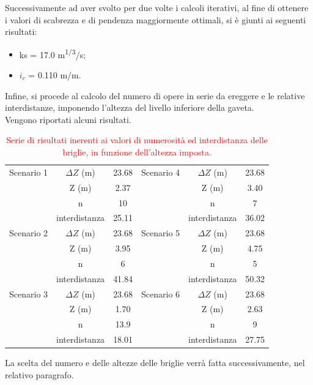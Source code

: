 Successivamente ad aver svolto per due volte i calcoli iterativi, al fine di ottenere i valori di scabrezza e di pendenza maggiormente ottimali, si è giunti ai seguenti risultati:
\begin{itemize}
    \item ks = 17.0 \unit{m^{1/3}/s};
    \item $i_c$ = 0.110 \unit{m/m}.
\end{itemize}

Infine, si procede al calcolo del numero di opere in serie da ereggere e le relative interdistanze, imponendo l'altezza del livello inferiore della gaveta.\\
Vengono riportati alcuni risultati.
\begin{table}[H] \centering
    \caption{\textcolor{red}{Serie di risultati inerenti ai valori di numerosità ed interdistanza delle briglie, in funzione dell'altezza imposta.}}
    \begin{tabular}{ccc|ccc}
        \toprule
    Scenario 1 & $\Delta Z$ (m)& 23.68 & Scenario 4 & $\Delta Z$ (m) & 23.68 \\
& Z (m)         & 2.37  &            & Z (m)         & 3.40  \\
& n             & 10  &            & n             & 7  \\
& interdistanza & 25.11 &            & interdistanza & 36.02 \\
\midrule
Scenario 2 & $\Delta Z$ (m)        & 23.68 & Scenario 5 & $\Delta Z$ (m) & 23.68 \\
& Z (m)         & 3.95  &            & Z (m)         & 4.75  \\
& n             & 6   &            & n             & 5   \\
& interdistanza & 41.84 &            & interdistanza & 50.32 \\
    \midrule
Scenario 3 & $\Delta Z$ (m)        & 23.68 & Scenario 6 & $\Delta Z$ (m)        & 23.68 \\
& Z (m)         & 1.70  &            & Z (m)         & 2.63  \\
& n             & 13.9  &            & n             & 9  \\
& interdistanza & 18.01 &            & interdistanza & 27.75 \\
\bottomrule
\end{tabular}
\label{opzioni_numero_altezza_briglie}
\end{table}
La scelta del numero e delle altezze delle briglie verrà fatta successivamente, nel relativo paragrafo.

